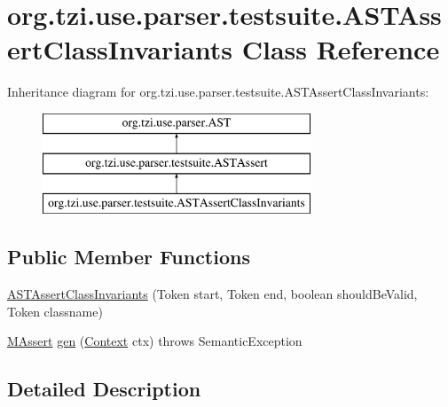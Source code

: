 \hypertarget{classorg_1_1tzi_1_1use_1_1parser_1_1testsuite_1_1_a_s_t_assert_class_invariants}{\section{org.\-tzi.\-use.\-parser.\-testsuite.\-A\-S\-T\-Assert\-Class\-Invariants Class Reference}
\label{classorg_1_1tzi_1_1use_1_1parser_1_1testsuite_1_1_a_s_t_assert_class_invariants}
}
Inheritance diagram for org.\-tzi.\-use.\-parser.\-testsuite.\-A\-S\-T\-Assert\-Class\-Invariants\-:\begin{figure}[H]
\begin{center}
\leavevmode
\includegraphics[height=3.000000cm]{classorg_1_1tzi_1_1use_1_1parser_1_1testsuite_1_1_a_s_t_assert_class_invariants}
\end{center}
\end{figure}
\subsection*{Public Member Functions}
\begin{DoxyCompactItemize}
\item 
\hyperlink{classorg_1_1tzi_1_1use_1_1parser_1_1testsuite_1_1_a_s_t_assert_class_invariants_aa98f65749520ba9b4538f634e3db3bfc}{A\-S\-T\-Assert\-Class\-Invariants} (Token start, Token end, boolean should\-Be\-Valid, Token classname)
\item 
\hyperlink{classorg_1_1tzi_1_1use_1_1uml_1_1sys_1_1testsuite_1_1_m_assert}{M\-Assert} \hyperlink{classorg_1_1tzi_1_1use_1_1parser_1_1testsuite_1_1_a_s_t_assert_class_invariants_ad6a05f94074604319f354c4c3556ee21}{gen} (\hyperlink{classorg_1_1tzi_1_1use_1_1parser_1_1_context}{Context} ctx)  throws Semantic\-Exception 
\end{DoxyCompactItemize}


\subsection{Detailed Description}


